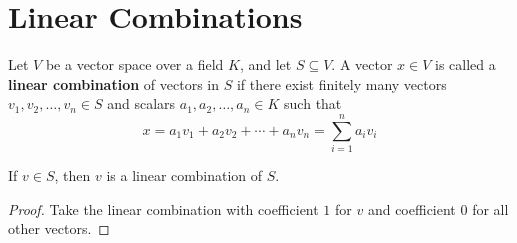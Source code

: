 \section{Linear Combinations}

\begin{definition}
  \label{definition : linear_combination}
  \leanok
  Let $V$ be a vector space over a field $K$, and let $S \subseteq V$. A vector $x \in V$ is called a \textbf{linear combination} of vectors in $S$ if there exist finitely many vectors $v_1, v_2, \ldots, v_n \in S$ and scalars $a_1, a_2, \ldots, a_n \in K$ such that
  $$x = a_1 v_1 + a_2 v_2 + \cdots + a_n v_n = \sum_{i=1}^{n} a_i v_i$$
\end{definition}

\begin{theorem}
  \label{theorem : linear_combination_of_mem}
  \leanok
  If $v \in S$, then $v$ is a linear combination of $S$.
\end{theorem}

\begin{proof}
  Take the linear combination with coefficient $1$ for $v$ and coefficient $0$ for all other vectors.
\end{proof}
